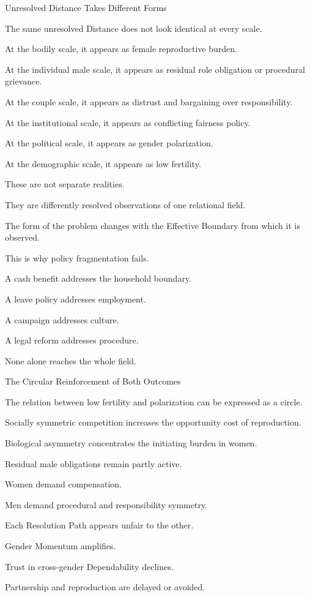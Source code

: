 Unresolved Distance Takes Different Forms

The same unresolved Distance does not look identical at every scale.

At the bodily scale, it appears as female reproductive burden.

At the individual male scale, it appears as residual role obligation or procedural grievance.

At the couple scale, it appears as distrust and bargaining over responsibility.

At the institutional scale, it appears as conflicting fairness policy.

At the political scale, it appears as gender polarization.

At the demographic scale, it appears as low fertility.

These are not separate realities.

They are differently resolved observations of one relational field.

The form of the problem changes with the Effective Boundary from which it is observed.

This is why policy fragmentation fails.

A cash benefit addresses the household boundary.

A leave policy addresses employment.

A campaign addresses culture.

A legal reform addresses procedure.

None alone reaches the whole field.

The Circular Reinforcement of Both Outcomes

The relation between low fertility and polarization can be expressed as a circle.

Socially symmetric competition increases the opportunity cost of reproduction.

Biological asymmetry concentrates the initiating burden in women.

Residual male obligations remain partly active.

Women demand compensation.

Men demand procedural and responsibility symmetry.

Each Resolution Path appears unfair to the other.

Gender Momentum amplifies.

Trust in cross-gender Dependability declines.

Partnership and reproduction are delayed or avoided.

